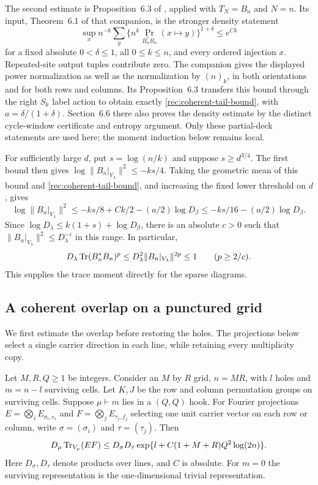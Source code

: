 The second estimate is Proposition~6.3 of \citet{OpenAI2026Routing}, applied with $T_N=B_n$ and $N=n$. Its input, Theorem~6.1 of that companion, is the stronger density statement
\begin{equation}\label{rec:coherent-density}
 \sup_x n^{-k}\sum_y
       \{n^k\Pr_{B_n^*B_n}(x\mapsto y)\}^{1+\delta}
       \le e^{Ck}
\end{equation}
for a fixed absolute $0<\delta\le1$, all $0\le k\le n$, and every ordered injection $x$. Repeated-site output tuples contribute zero. The companion gives the displayed power normalization as well as the normalization by $(n)_k$, in both orientations and for both rows and columns. Its Proposition~6.3 transfers this bound through the right $S_k$ label action to obtain exactly \eqref{rec:coherent-tail-bound}, with $a=\delta/(1+\delta)$. Section~6.6 there also proves the density estimate by the distinct cycle-window certificate and entropy argument. Only these partial-deck statements are used here; the moment induction below remains local.

For sufficiently large $d$, put $s=\log(n/k)$ and suppose
$s\ge d^{3/4}$.  The first bound then gives
$\log\|B_n|_{V_\lambda}\|^2\le-ks/4$.
Taking the geometric mean of this bound and
\eqref{rec:coherent-tail-bound}, and increasing the fixed lower
threshold on $d$, gives
\[
 \log\|B_n|_{V_\lambda}\|^2
 \le-ks/8+Ck/2-(a/2)\log D_\beta
 \le-ks/16-(a/2)\log D_\beta.
\]
Since $\log D_\lambda\le k(1+s)+\log D_\beta$, there is an
absolute $c>0$ such that $\|B_n|_{V_\lambda}\|^2\le D_\lambda^{-c}$
in this range.  In particular,
\[
 D_\lambda\operatorname{Tr}(B_n^*B_n)^p
 \le D_\lambda^2\|B_n|_{V_\lambda}\|^{2p}\le1
 \qquad(p\ge2/c).
\]
This supplies the trace moment directly for the sparse diagrams.

\subsection{A coherent overlap on a punctured grid}

We first estimate the overlap before restoring the holes.  The
projections below select a single carrier direction in each line,
while retaining every multiplicity copy.

\begin{proposition}
\label{prop:coherent-hook}
Let $M,R,Q\ge1$ be integers.  Consider an $M$ by $R$ grid,
$n=MR$, with $l$ holes and $m=n-l$ surviving cells.  Let $K,J$ be the row and column permutation groups
on surviving cells.  Suppose $\mu\vdash m$ lies in a $(Q,Q)$ hook.
For Fourier projections $E=\bigotimes_i E_{\sigma_i,e_i}$ and $F=\bigotimes_j E_{\tau_j,f_j}$ selecting one unit carrier vector on each row or column, write $\sigma=(\sigma_i)$ and $\tau=(\tau_j)$. Then
\begin{equation}\label{rec:coherent-hook-grid}
 D_\mu\operatorname{Tr}_{V_\mu}(EF)
 \le D_\sigma D_\tau
       \exp\{l+C(1+M+R)Q^2\log(2n)\}.
\end{equation}
Here $D_\sigma,D_\tau$ denote products over lines, and $C$ is
absolute.  For $m=0$ the
surviving representation is the one-dimensional trivial representation.
\end{proposition}

